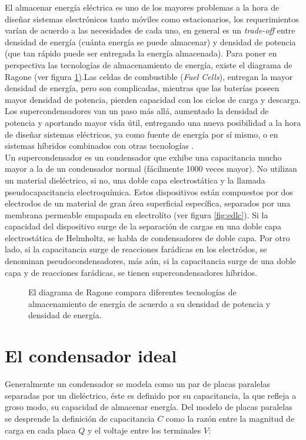 El almacenar energía eléctrica es uno de los mayores problemas a la hora de diseñar sistemas electrónicos tanto móviles como estacionarios, los requerimientos varían de acuerdo a las necesidades de cada uno, en general es un \textit{trade-off} entre densidad de energía (cuánta energía se puede almacenar) y densidad de potencia (que tan rápido puede ser entregada la energía almacenada). Para poner en perspectiva las tecnologías de almacenamiento de energía, existe el diagrama de Ragone (ver figura \ref{fig:ragone}).Las celdas de combustible (\textit{Fuel Cells}), entregan la mayor densidad de energía, pero son complicadas, mientras que las baterías poseen mayor densidad de potencia, pierden capacidad con los ciclos de carga y descarga. Los supercondensadores van un paso más allá, aumentado la densidad de potencia y aportando mayor vida útil, entregando una nueva posibilidad a la hora de diseñar sistemas eléctricos, ya como fuente de energía por sí mismo, o en sistemas híbridos combinados con otras tecnologías \citep{Thounthong2009}.\\
Un supercondensador es un condensador que exhibe una capacitancia mucho mayor a la de un condensador normal (fácilmente 1000 veces mayor). No utilizan un material dieléctrico, si no, una doble capa electrostática y la llamada pseudocapacitancia electroquímica. Estos dispositivos están compuestos por dos electrodos de un material de gran área superficial específica, separados por una membrana permeable empapada en electrolíto (ver figura \ref{fig:edlc}). Si la capacidad del dispositivo surge de la separación de cargas en una doble capa electrostática de Helmholtz, se habla de condensadores de doble capa. Por otro lado, si la capacitancia surge de reacciones farádicas en los electródos, se denominan pseudocondensadores, más aún, si la capacitancia surge de una doble capa y de reacciones farádicas, se tienen supercondensadores híbridos.

\begin{figure}
	\centering
	\caption[Diagrama de Ragone]{El diagrama de Ragone compara diferentes tecnologías de almacenamiento de energía de acuerdo a su densidad de potencia y densidad de energía.}
	\label{fig:ragone}
\end{figure}

\section{El condensador ideal}
Generalmente un condensador se modela como un par de placas paralelas separadas por un dieléctrico, éste es definido por su capacitancia, la que refleja a groso modo, su capacidad de almacenar energía. Del modelo de placas paralelas se desprende la definición de capacitancia $C$ como la razón entre la magnitud de carga en cada placa $Q$ y el voltaje entre los terminales $V$:

